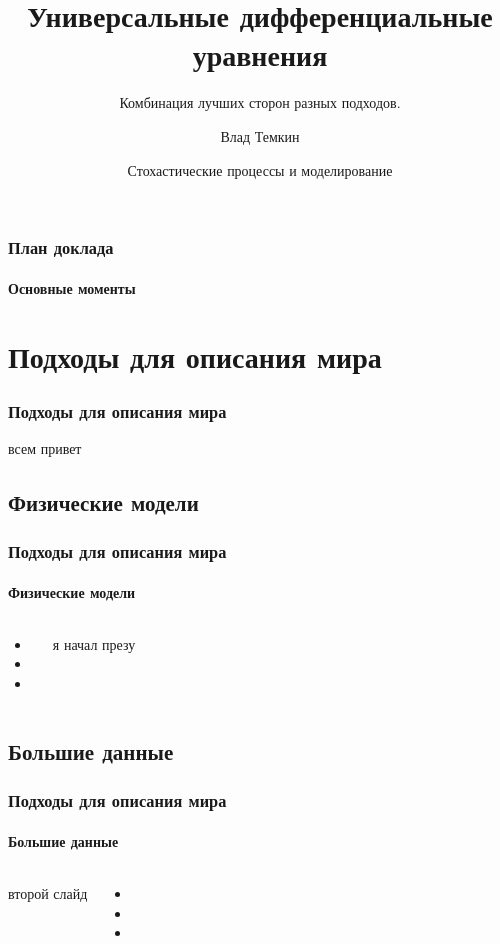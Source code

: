\documentclass[10pt,pdf,hyperref={unicode}]{beamer}
\title[UDE]{Универсальные дифференциальные уравнения}
\subtitle{Комбинация лучших сторон разных подходов.}
\author{Влад Темкин}
\institute[HSE] %
{
	Высшая Школа Экономики\\
	Факультет Физики
}
\date[\today]
{Стохастические процессы и моделирование}
\begin{document}
	
	\begin{frame}
		\titlepage
	\end{frame} 
	
	
	\begin{frame}
		\frametitle{План доклада} 
		\framesubtitle{Основные моменты}
		\tableofcontents[pausesections]
	\end{frame}


	\section{Подходы для описания мира}
	
		\begin{frame}
			\frametitle{Подходы для описания мира} 
				всем привет
		\end{frame}
	
	
		\subsection{Физические модели}
		
			\begin{frame}
				\frametitle{Подходы для описания мира} 
				\framesubtitle{Физические модели}
					\begin{columns}
						\column{0.5\linewidth}
						\begin{center}
							\begin{itemize}
								\item
								\item
								\item
							\end{itemize}
						\end{center}
						\column{0.5\linewidth}
						я начал презу
					\end{columns}
			\end{frame}
		
		
		\subsection{Большие данные}
		
			\begin{frame}
				\frametitle{Подходы для описания мира} 
				\framesubtitle{Большие данные}
					\begin{columns}
						второй слайд
						\begin{center}
							\begin{itemize}
								\item
								\item
								\item
							\end{itemize}
						\end{center}
					\end{columns}
			\end{frame}
			
\end{document}
